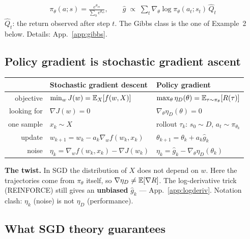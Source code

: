 \begin{coolbox}[title={Example: REINFORCE with a Gibbs (softmax) policy}]
\begin{gather*}
  \pi_\theta(a;s) = \frac{e^{\theta_{sa}}}{\sum_b e^{\theta_{sb}}}, \qquad
  \hat g \;\propto\; \sum_t \nabla_\theta \log \pi_\theta(a_t;s_t)\, \hat Q_t
\end{gather*}
$\hat Q_t$: the return observed after step $t$. The Gibbs class is the one of Example~2 below. Details: App.~\ref{app:gibbs}.
\end{coolbox}

\subsection{Policy gradient is stochastic gradient ascent}

\begin{center}
\small
\begin{tabular}{r l l}
\toprule
 & {\color{AtlasSlate}\textbf{Stochastic gradient descent}} & {\color{AtlasCool}\textbf{Policy gradient}} \\
\midrule
{\color{NoteGray}objective} & $\min_w J(w)=\mathbb{E}_X[f(w,X)]$ & $\max_\theta \eta_D(\theta)=\mathbb{E}_{\tau\sim\pi_\theta}[R(\tau)]$ \\
{\color{NoteGray}looking for} & $\nabla J(w)=0$ & $\nabla_\theta\eta_D(\theta)=0$ \\
{\color{NoteGray}one sample} & $x_k\sim X$ & rollout $\tau_k$: $s_0\sim D$, $a_t\sim\pi_{\theta_k}$ \\
{\color{NoteGray}update} & $w_{k+1}=w_k-a_k\nabla_w f(w_k,x_k)$ & $\theta_{k+1}=\theta_k+a_k\hat g_k$ \\
{\color{NoteGray}noise} & $\eta_k=\nabla_w f(w_k,x_k)-\nabla J(w_k)$ & $\eta_k=\hat g_k-\nabla_\theta\eta_D(\theta_k)$ \\
\bottomrule
\end{tabular}
\end{center}

\begin{notebox}
\textbf{The twist.} In SGD the distribution of $X$ does not depend on $w$. Here the trajectories come from $\pi_\theta$ itself, so $\nabla\eta_D\neq\mathbb{E}[\nabla R]$. The log-derivative trick (REINFORCE) still gives an \textbf{unbiased} $\hat g_k$ --- App.~\ref{app:logderiv}. Notation clash: $\eta_k$ (noise) is not $\eta_D$ (performance).
\end{notebox}

\subsection{What SGD theory guarantees}

